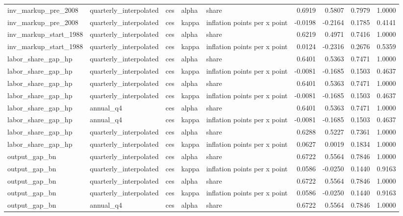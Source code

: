 \begin{tabular}{lllllrrrr}
inv\_markup\_pre\_2008 & quarterly\_interpolated & ces & alpha & share & 0.6919 & 0.5807 & 0.7979 & 1.0000 \\
inv\_markup\_pre\_2008 & quarterly\_interpolated & ces & kappa & inflation points per x point & -0.0198 & -0.2164 & 0.1785 & 0.4141 \\
inv\_markup\_start\_1988 & quarterly\_interpolated & ces & alpha & share & 0.6219 & 0.4971 & 0.7416 & 1.0000 \\
inv\_markup\_start\_1988 & quarterly\_interpolated & ces & kappa & inflation points per x point & 0.0124 & -0.2316 & 0.2676 & 0.5359 \\
labor\_share\_gap\_hp & quarterly\_interpolated & ces & alpha & share & 0.6401 & 0.5363 & 0.7471 & 1.0000 \\
labor\_share\_gap\_hp & quarterly\_interpolated & ces & kappa & inflation points per x point & -0.0081 & -0.1685 & 0.1503 & 0.4637 \\
labor\_share\_gap\_hp & quarterly\_interpolated & ces & alpha & share & 0.6401 & 0.5363 & 0.7471 & 1.0000 \\
labor\_share\_gap\_hp & quarterly\_interpolated & ces & kappa & inflation points per x point & -0.0081 & -0.1685 & 0.1503 & 0.4637 \\
labor\_share\_gap\_hp & annual\_q4 & ces & alpha & share & 0.6401 & 0.5363 & 0.7471 & 1.0000 \\
labor\_share\_gap\_hp & annual\_q4 & ces & kappa & inflation points per x point & -0.0081 & -0.1685 & 0.1503 & 0.4637 \\
labor\_share\_gap\_hp & quarterly\_interpolated & ces & alpha & share & 0.6288 & 0.5227 & 0.7361 & 1.0000 \\
labor\_share\_gap\_hp & quarterly\_interpolated & ces & kappa & inflation points per x point & 0.0627 & 0.0019 & 0.1834 & 1.0000 \\
output\_gap\_bn & quarterly\_interpolated & ces & alpha & share & 0.6722 & 0.5564 & 0.7846 & 1.0000 \\
output\_gap\_bn & quarterly\_interpolated & ces & kappa & inflation points per x point & 0.0586 & -0.0250 & 0.1440 & 0.9163 \\
output\_gap\_bn & quarterly\_interpolated & ces & alpha & share & 0.6722 & 0.5564 & 0.7846 & 1.0000 \\
output\_gap\_bn & quarterly\_interpolated & ces & kappa & inflation points per x point & 0.0586 & -0.0250 & 0.1440 & 0.9163 \\
output\_gap\_bn & annual\_q4 & ces & alpha & share & 0.6722 & 0.5564 & 0.7846 & 1.0000 \\

\end{tabular}
